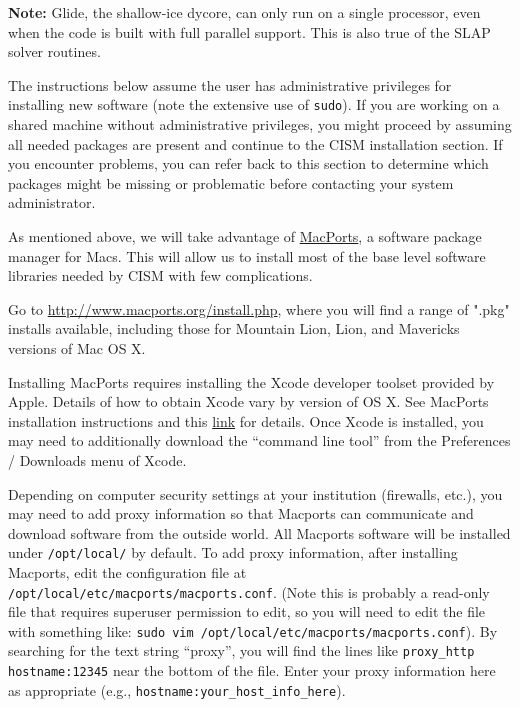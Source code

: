 \textbf{Note:} Glide, the shallow-ice dycore, can only run on a single processor, 
even when the code is built with full parallel support. This is also true of the SLAP
solver routines.

The instructions below assume the user has administrative privileges for
installing new software (note the extensive use of \texttt{sudo}).  
If you are working on a shared machine without
administrative privileges, you might proceed by assuming all needed packages are present and 
continue to the CISM installation section.  If you encounter problems, you can refer back to this
section to determine which packages might be missing or
problematic before contacting your system administrator.


\begin{mdframed}[style=mac] %
As mentioned above, we will take advantage of \href{http://www.macports.org/}{MacPorts}, 
a software package manager for Macs. This will allow us to install most of 
the base level software libraries needed by CISM with few complications. 

Go to \href{http://www.macports.org/install.php}{http://www.macports.org/install.php}, where you will find a range of ".pkg" installs available, including those for Mountain Lion, Lion, and Mavericks versions of Mac OS X. 

Installing MacPorts requires installing the Xcode developer toolset provided by Apple. Details of how to obtain Xcode vary by version of OS X. See MacPorts installation instructions and this \href{https://developer.apple.com/xcode/downloads/}{link} for details. Once Xcode is installed, you may need to additionally download the ``command line tool'' from the Preferences / Downloads menu of Xcode. 

Depending on computer security settings at your institution (firewalls, etc.), 
you may need to add proxy information so that Macports can communicate and 
download software from the outside world. All Macports software will be installed 
under \texttt{/opt/local/} by default. To add proxy information, after installing 
Macports, edit the configuration file at \texttt{/opt/local/etc/macports/macports.conf}.
(Note this is probably a read-only file that requires superuser permission to edit,
so you will need to edit the file with something like: \texttt{sudo vim /opt/local/etc/macports/macports.conf}). 
By searching for the text string ``proxy'', you will find the lines like 
\texttt{proxy\_http hostname:12345} near the bottom of the file. Enter your proxy 
information here as appropriate (e.g., \texttt{hostname:your\_host\_info\_here}).


\end{mdframed}
